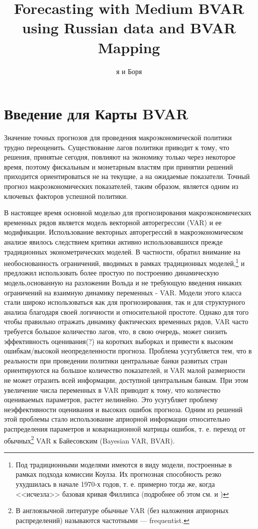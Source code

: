 \documentclass[11pt]{article} %
\title{Forecasting with Medium BVAR using Russian data and BVAR Mapping}
\author{я и Боря}
\begin{document}
\maketitle
\section{Введение для Карты BVAR}

Значение точных прогнозов для проведения макроэкономической политики трудно переоценить. Существование лагов политики приводит к тому, что решения, принятые сегодня, повлияют на экономику только через некоторое время, поэтому фискальным и монетарным властям при принятии решений приходится ориентироваться не на текущие, а на ожидаемые показатели. Точный прогноз макроэкономических показателей, таким образом, является одним из ключевых факторов успешной политики.

В настоящее время основной моделью для прогнозирования макроэкономических временных рядов является модель векторной  авторегрессии (VAR) и ее модификации. Использование векторных авторегрессий в макроэкономическом анализе явилось следствием критики активно использовавшихся прежде традиционных эконометрических моделей. В частности, \cite{sims_1980} обратил внимание на необоснованность ограничений, вводимых в рамках традиционных моделей,\footnote{Под традиционными моделями имеются в виду модели, построенные в рамках подхода комиссии Коулза. Их прогнозная способность резко ухудшилась в начале 1970-х годов, т. е. примерно тогда же, когда <<исчезла>> базовая кривая Филлипса (подробнее об этом см. \cite{favero_2001} и  \cite{malakhovskaya_pekarsky_2012})} и предложил использовать более простую по построению динамическую модель,основанную на разложении Вольда и не требующую введения никаких ограничений на взаимную динамику переменных - VAR. Модели этого класса стали широко использоваться как для прогнозирования, так и для структурного анализа благодаря своей логичности и относительной простоте.   Однако для того чтобы правильно отражать динамику фактических временных рядов, VAR часто требуется большое количество лагов, что, в свою очередь, может снизить эффективность оценивания(?) на коротких выборках и привести к высоким ошибкам/высокой неопределенности прогноза. Проблема усугубляется тем, что в реальности при проведении политики центральные банки развитых стран ориентируются на большое количество показателей, и VAR малой размерности не может отразить всей информации, доступной центральным банкам. При этом увеличение числа переменных в VAR приводит к тому, что количество оцениваемых параметров, растет нелинейно. Это усугубляет проблему неэффективности оценивания и высоких ошибок прогноза. 
Одним из решений этой проблемы стало использование априорной информации относительно распределения параметров и ковариационной матрицы ошибок, т. е. переход от обычных\footnote{В англоязычной литературе обычные VAR (без наложения априорных распределений) называются частотными --- frequentist.} VAR к Байесовским (Bayesian VAR, BVAR). 
\end{document}
